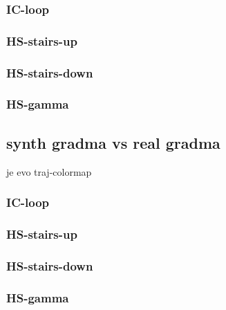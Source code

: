 \subsubsection{IC-loop}
\subsubsection{HS-stairs-up}
\subsubsection{HS-stairs-down}
\subsubsection{HS-gamma}

\subsection{synth gradma vs real gradma}
je evo traj-colormap
\subsubsection{IC-loop}
\subsubsection{HS-stairs-up}
\subsubsection{HS-stairs-down}
\subsubsection{HS-gamma}
